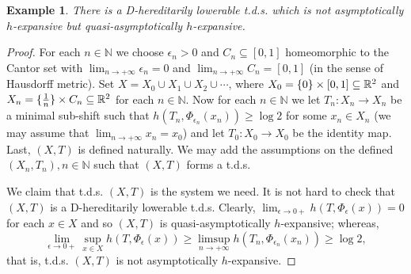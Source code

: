 \documentclass[12pt]{amsart}
\newtheorem{ex}[thm]{Example}
\theoremstyle{definition} \theoremstyle{question}
\numberwithin{equation}{section}
\begin{document}
\begin{ex} \label{0905221459}
There is a D-hereditarily lowerable t.d.s. which is not
asymptotically $h$-expansive but quasi-asymptotically $h$-expansive.
\end{ex}
\begin{proof}
For each $n\in {\mathbb N}$ we choose $\epsilon_n> 0$ and $C_n\subseteq [0,
1]$ homeomorphic to the Cantor set with $\lim_{n\rightarrow +\infty}
\epsilon_n= 0$ and $\lim_{n\rightarrow +\infty} C_n= [0, 1]$ (in the
sense of Hausdorff metric). Set $X= X_0\cup X_1\cup X_2\cup \cdots$,
where $X_0= \{0\}\times [0, 1]\subseteq {\Bbb R}^2$ and $X_n=
\{\frac{1}{n}\}\times C_n\subseteq {\Bbb R}^2$ for each $n\in {\mathbb N}$. Now for
each $n\in {\mathbb N}$ we let $T_n: X_n\rightarrow X_n$ be a minimal
sub-shift such that $h (T_n, \Phi_{\epsilon_n} (x_n))\ge \log 2$ for
some $x_n\in X_n$ (we may assume that $\lim_{n\rightarrow +\infty}
x_n= x_0$) and let $T_0: X_0\rightarrow X_0$ be the identity map.
Last, $(X, T)$ is defined naturally. We may add the assumptions on
the defined $(X_n, T_n), n\in {\mathbb N}$ such that $(X, T)$ forms a t.d.s.

We claim that t.d.s. $(X, T)$ is the system we need. It is not hard
to check that $(X, T)$ is a D-hereditarily lowerable t.d.s.
Clearly, $\lim_{\epsilon\rightarrow 0+} h (T, \Phi_\epsilon (x))= 0$
for each $x\in X$ and so $(X, T)$ is quasi-asymptotically
$h$-expansive; whereas, $$\lim_{{\epsilon}\rightarrow 0+} \sup_{x\in X} h
(T, \Phi_{\epsilon}(x))\ge \limsup_{n\rightarrow +\infty} h (T_n,
\Phi_{\epsilon_n} (x_n))\ge \log 2,$$ that is, t.d.s. $(X, T)$ is
not asymptotically $h$-expansive.


\end{proof}
\end{document}
